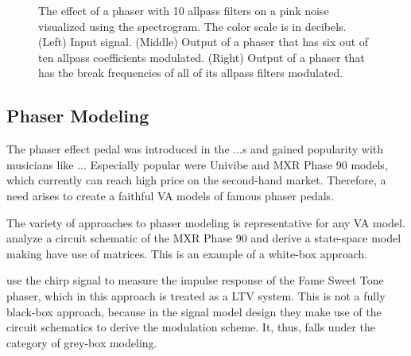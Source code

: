 \newcommand{\scaleboxsize}{0.65}
\newcommand{\subfigurewidththree}{0.3\textwidth}
\begin{figure}
    \begin{subfigure}{0.33\textwidth}
        \centering
        \scalebox{\scaleboxsize}{}
    \end{subfigure}
    \begin{subfigure}{0.28\textwidth}
        \centering
        \scalebox{\scaleboxsize}{}
    \end{subfigure}
    \begin{subfigure}{0.34\textwidth}
        \centering
        \scalebox{0.66}{}
    \end{subfigure}
    \caption{The effect of a phaser with 10 allpass filters on a pink noise visualized using the spectrogram. The color scale is in decibels. (Left) Input signal. (Middle) Output of a phaser that has six out of ten allpass coefficients modulated. (Right) Output of a phaser that has the break frequencies of all of its allpass filters modulated.}
    \label{fig:pink_noise_phasered}
\end{figure}

\subsection{Phaser Modeling}

The phaser effect pedal was introduced in the ...s and gained popularity with musicians like ... Especially popular were Univibe and MXR Phase 90 models, which currently can reach high price on the second-hand market. Therefore, a need arises to create a faithful \ac{VA} models of famous phaser pedals.

The variety of approaches to phaser modeling is representative for any \ac{VA} model. \cite{Eichas2014} analyze a circuit schematic of the MXR Phase 90 and derive a state-space model making have use of matrices. This is an example of a white-box approach.

\cite{Kiiski2016} use the chirp signal to measure the impulse response of the Fame Sweet Tone phaser, which in this approach is treated as a \ac{LTV} system. This is not a fully black-box approach, because in the signal model design they make use of the circuit schematics to derive the modulation scheme. It, thus, falls under the category of grey-box modeling.

